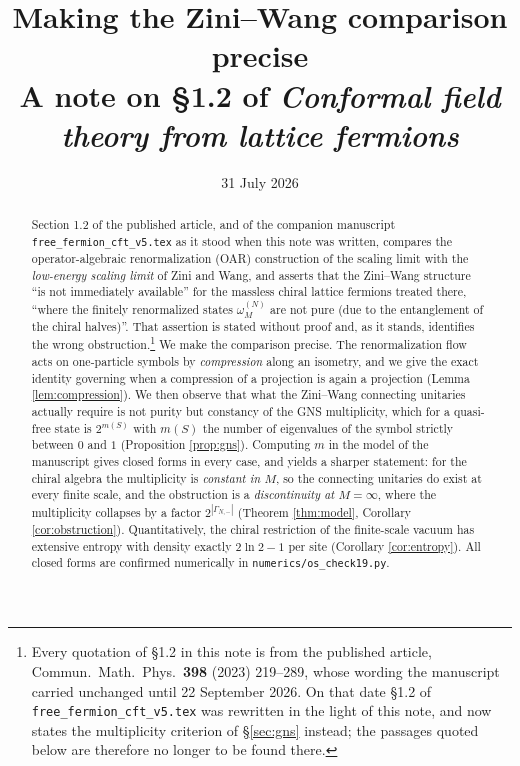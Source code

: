 \documentclass[11pt,a4paper]{article}
\title{\bf Making the Zini--Wang comparison precise\\[0.3cm]
\large A note on \S1.2 of \emph{Conformal field theory from lattice fermions}}
\author{}
\date{31 July 2026}
\theoremstyle{definition}
\newcommand{\1}{\mathds{1}}
\newcommand{\Gam}{\Gamma}
\begin{document}
\maketitle

\begin{abstract}
Section 1.2 of the published article, and of the companion manuscript
\texttt{free\_fermion\_cft\_v5.tex} as it stood when this note was written, compares the
operator-algebraic renormalization (OAR) construction of the scaling limit with the
\emph{low-energy scaling limit} of Zini and Wang, and asserts that the Zini--Wang structure ``is not
immediately available'' for the massless chiral lattice fermions treated there, ``where the finitely
renormalized states $\omega^{(N)}_{M}$ are not pure (due to the entanglement of the chiral halves)''.
That assertion is stated without proof and, as it stands, identifies the wrong obstruction.\footnote{%
Every quotation of \S1.2 in this note is from the published article, Commun.\ Math.\ Phys.\
\textbf{398} (2023) 219--289, whose wording the manuscript carried unchanged until 22 September 2026.
On that date \S1.2 of \texttt{free\_fermion\_cft\_v5.tex} was rewritten in the light of this note,
and now states the multiplicity criterion of \S\ref{sec:gns} instead; the passages quoted
below are therefore no longer to be found there.} We make
the comparison precise. The renormalization flow acts on one-particle symbols by \emph{compression}
along an isometry, and we give the exact identity governing when a compression of a projection is
again a projection (Lemma \ref{lem:compression}). We then observe that what the Zini--Wang
connecting unitaries actually require is not purity but constancy of the GNS multiplicity, which for
a quasi-free state is $2^{m(S)}$ with $m(S)$ the number of eigenvalues of the symbol strictly between
$0$ and $1$ (Proposition \ref{prop:gns}). Computing $m$ in the model of the manuscript gives closed
forms in every case, and yields a sharper statement: for the chiral algebra the multiplicity is
\emph{constant in $M$}, so the connecting unitaries do exist at every finite scale, and the
obstruction is a \emph{discontinuity at $M=\infty$}, where the multiplicity collapses by a factor
$2^{|\Gam_{N,-}|}$ (Theorem \ref{thm:model}, Corollary \ref{cor:obstruction}). Quantitatively, the
chiral restriction of the finite-scale vacuum has extensive entropy with density exactly
$2\ln2-1$ per site (Corollary \ref{cor:entropy}). All closed forms are confirmed numerically in
\texttt{numerics/os\_check19.py}.
\end{abstract}
\end{document}
